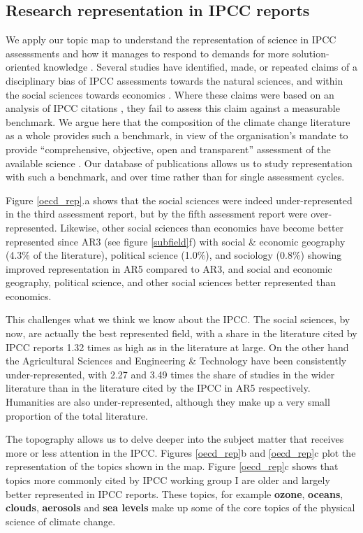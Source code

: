 \documentclass{article}
\begin{document}
\begin{linenumbers}
		\subsection*{Research representation in IPCC reports}
		We apply our topic map to understand the representation of science in IPCC assesssments and how it manages to respond to demands for more solution-oriented knowledge \cite{Kowarsch2017}. Several studies have identified, made, or repeated claims of a disciplinary bias of IPCC assessments towards the natural sciences, and within the social sciences towards economics \cite{Bjurström2011, Victor2015, Hulme2010, Corbera2016}. Where these claims were based on an analysis of IPCC citations \cite{Bjurström2011}, they fail to assess this claim against a measurable benchmark. We argue here that the composition of the climate change literature as a whole provides such a benchmark, in view of the organisation's mandate to provide ``comprehensive, objective, open and transparent'' assessment of the available science \cite{IPCC2013}. Our database of publications allows us to study representation with such a benchmark, and over time rather than for single assessment cycles.
		
		Figure \ref{oecd_rep}.a shows that the social sciences were indeed under-represented in the third assessment report, but by the fifth assessment report were over-represented. Likewise, other social sciences than economics have become better represented since AR3  (see figure \ref{subfield}f) with social \& economic geography (4.3\% of the literature), political science (1.0\%), and sociology (0.8\%) showing improved representation in AR5 compared to AR3, and social and economic geography, political science, and other social sciences better represented than economics. 
		
		This challenges what we think we know about the IPCC. The social sciences, by now, are actually the best represented field, with a share in the literature cited by IPCC reports 1.32 times as high as in the literature at large.  On the other hand the Agricultural Sciences and Engineering \& Technology have been consistently under-represented, with 2.27 and 3.49 times the share of studies in the wider literature than in the literature cited by the IPCC in AR5 respectively. Humanities are also under-represented, although they make up a very small proportion of the total literature.
		
		
		The topography allows us to delve deeper into the subject matter that receives more or less attention in the IPCC. Figures \ref{oecd_rep}b and \ref{oecd_rep}c plot the representation of the topics shown in the map. Figure \ref{oecd_rep}c shows that topics more commonly cited by IPCC working group I are older and largely better represented in IPCC reports. These topics, for example \textbf{ozone}, \textbf{oceans}, \textbf{clouds}, \textbf{aerosols} and \textbf{sea levels} make up some of the core topics of the physical science of climate change.
		

\end{linenumbers}
\end{document}
